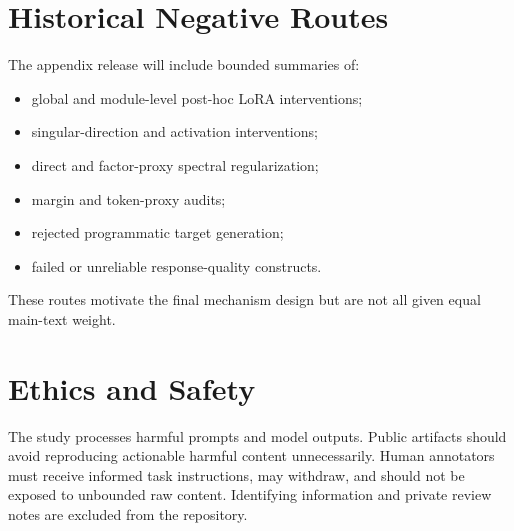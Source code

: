 \section{Historical Negative Routes}

The appendix release will include bounded summaries of:
\begin{itemize}[leftmargin=*]
  \item global and module-level post-hoc LoRA interventions;
  \item singular-direction and activation interventions;
  \item direct and factor-proxy spectral regularization;
  \item margin and token-proxy audits;
  \item rejected programmatic target generation;
  \item failed or unreliable response-quality constructs.
\end{itemize}
These routes motivate the final mechanism design but are not all given equal main-text weight.

\section{Ethics and Safety}

The study processes harmful prompts and model outputs. Public artifacts should avoid reproducing actionable harmful content unnecessarily. Human annotators must receive informed task instructions, may withdraw, and should not be exposed to unbounded raw content. Identifying information and private review notes are excluded from the repository.
